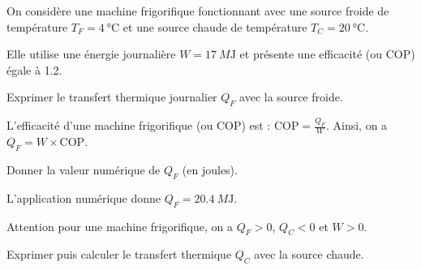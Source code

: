 On considère une machine frigorifique fonctionnant avec une source froide de température $T_F=\SI{4}{\celsius}$ et une source chaude de température $T_C=\SI{20}{\celsius}$. 

Elle utilise une énergie journalière $W=\SI{17}{M\joule}$ et présente une efficacité (ou COP) égale à \SI{1,2}{}.

\debutEntrainement

\smallskip


\begin{enonce}
	Exprimer le transfert thermique journalier $Q_F$ avec la source froide.
	
\end{enonce}


\begin{corrige}
L'efficacité d'une machine frigorifique (ou COP) est : $\text{COP}=\frac{Q_F}{W}$. Ainsi, on a $Q_F=W\times \text{COP}$.
\end{corrige}



\begin{enonce}
	Donner la valeur numérique de $Q_F$ (en joules).
	
\end{enonce}


\begin{corrige}
L'application numérique donne $Q_F=\SI{20,4}{M\joule}$. 

Attention pour une machine frigorifique, on a  $Q_F>0$, $Q_C<0$ et $W>0$.
\end{corrige}




\begin{enonce}
	Exprimer puis calculer le transfert thermique $Q_C$ avec la source chaude.
	
\end{enonce}

